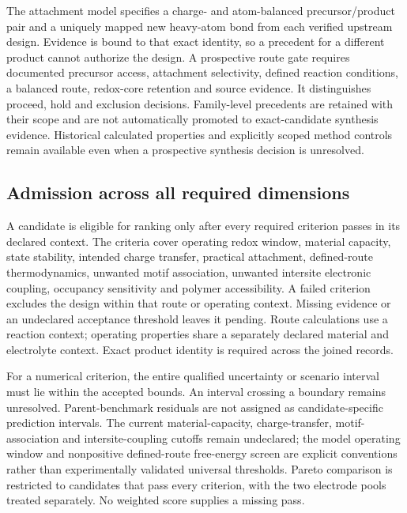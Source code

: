 \documentclass[11pt]{article}
\begin{document}
The attachment model specifies a charge- and atom-balanced precursor/product pair and a uniquely mapped new heavy-atom bond from each verified upstream design. Evidence is bound to that exact identity, so a precedent for a different product cannot authorize the design. A prospective route gate requires documented precursor access, attachment selectivity, defined reaction conditions, a balanced route, redox-core retention and source evidence. It distinguishes proceed, hold and exclusion decisions. Family-level precedents are retained with their scope and are not automatically promoted to exact-candidate synthesis evidence. Historical calculated properties and explicitly scoped method controls remain available even when a prospective synthesis decision is unresolved.

\subsection{Admission across all required dimensions}
A candidate is eligible for ranking only after every required criterion passes in its declared context. The criteria cover operating redox window, material capacity, state stability, intended charge transfer, practical attachment, defined-route thermodynamics, unwanted motif association, unwanted intersite electronic coupling, occupancy sensitivity and polymer accessibility. A failed criterion excludes the design within that route or operating context. Missing evidence or an undeclared acceptance threshold leaves it pending. Route calculations use a reaction context; operating properties share a separately declared material and electrolyte context. Exact product identity is required across the joined records.

For a numerical criterion, the entire qualified uncertainty or scenario interval must lie within the accepted bounds. An interval crossing a boundary remains unresolved. Parent-benchmark residuals are not assigned as candidate-specific prediction intervals. The current material-capacity, charge-transfer, motif-association and intersite-coupling cutoffs remain undeclared; the model operating window and nonpositive defined-route free-energy screen are explicit conventions rather than experimentally validated universal thresholds. Pareto comparison is restricted to candidates that pass every criterion, with the two electrode pools treated separately. No weighted score supplies a missing pass.
\end{document}
